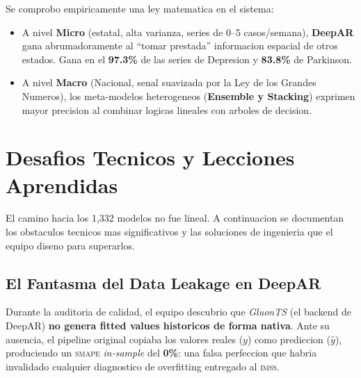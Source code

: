 \documentclass[12pt, letterpaper]{article}
\newcommand{\smape}{\textsc{smape}}
\newcommand{\imss}{\textsc{imss}}
\begin{document}
\begin{insightbox}
Se comprobo empiricamente una ley matematica en el sistema:
\begin{itemize}[noitemsep]
    \item A nivel \textbf{Micro} (estatal, alta varianza, series de 0--5 casos/semana), \textbf{DeepAR} gana abrumadoramente al ``tomar prestada'' informacion espacial de otros estados. Gana en el \textbf{97.3\%} de las series de Depresion y \textbf{83.8\%} de Parkinson.
    \item A nivel \textbf{Macro} (Nacional, senal suavizada por la Ley de los Grandes Numeros), los meta-modelos heterogeneos (\textbf{Ensemble y Stacking}) exprimen mayor precision al combinar logicas lineales con arboles de decision.
\end{itemize}
\end{insightbox}

\newpage

\section{Desafios Tecnicos y Lecciones Aprendidas}\label{sec:desafios}

El camino hacia los 1,332 modelos no fue lineal. A continuacion se documentan los obstaculos tecnicos mas significativos y las soluciones de ingenieria que el equipo diseno para superarlos.

\subsection{El Fantasma del Data Leakage en DeepAR}\label{subsec:leakage}

\begin{criticalbox}
Durante la auditoria de calidad, el equipo descubrio que \textit{GluonTS} (el backend de DeepAR) \textbf{no genera fitted values historicos de forma nativa}. Ante su ausencia, el pipeline original copiaba los valores reales ($y$) como prediccion ($\hat{y}$), produciendo un \smape{} \textit{in-sample} del \textbf{0\%}: una falsa perfeccion que habria invalidado cualquier diagnostico de overfitting entregado al \imss{}.
\end{criticalbox}
\end{document}
